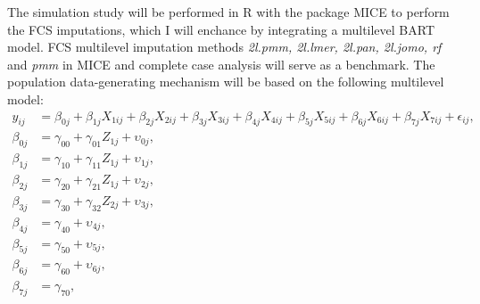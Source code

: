 \documentclass[10pt, a4paper, titlepage]{article}
\begin{document}
The simulation study will be performed in R \citep{rcoreteam2023} with the package MICE \citep{buuren2011} to perform the FCS imputations, which I will enchance by integrating a multilevel BART model. FCS multilevel imputation methods \textit{2l.pmm, 2l.lmer, 2l.pan, 2l.jomo, rf} and \textit{pmm} in MICE and complete case analysis will serve as a benchmark. The population data-generating mechanism will be based on the following multilevel model:
\begin{subequations}
\label{eq:population}
\begin{align}
y_{ij} &= \beta_{0j} + \beta_{1j}X_{1ij} + \beta_{2j}X_{2ij} + \beta_{3j}X_{3ij} + \beta_{4j}X_{4ij} + \beta_{5j}X_{5ij} + \beta_{6j}X_{6ij} + \beta_{7j}X_{7ij} + \epsilon_{ij}, \tag{4} \\
\beta_{0j} &= \gamma_{00} + \gamma_{01}Z_{1j} + \upsilon_{0j}, \tag{4.1} \\
\beta_{1j} &= \gamma_{10} + \gamma_{11}Z_{1j} + \upsilon_{1j}, \tag{4.2} \\
\beta_{2j} &= \gamma_{20} + \gamma_{21}Z_{1j} + \upsilon_{2j}, \tag{4.3} \\
\beta_{3j} &= \gamma_{30} + \gamma_{32}Z_{2j} + \upsilon_{3j}, \tag{4.4} \\
\beta_{4j} &= \gamma_{40} + \upsilon_{4j}, \tag{4.5} \\
\beta_{5j} &= \gamma_{50} + \upsilon_{5j}, \tag{4.6} \\
\beta_{6j} &= \gamma_{60} + \upsilon_{6j}, \tag{4.7} \\
\beta_{7j} &= \gamma_{70}, \tag{4.8}
\end{align}
\end{subequations}
\end{document}

